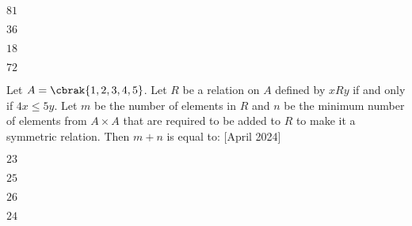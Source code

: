 \begin{enumerate}
\begin{multicols}{4}
\item $81$
\item $36$
\item $18$
\item $72$
\end{multicols}
\end{enumerate}
\item Let $A = \cbrak{1, 2, 3, 4, 5}$. Let $R$ be a relation on $A$ defined by $xRy$ if and only if $4x \leq 5y$. Let $m$ be the number of elements in $R$ and $n$ be the minimum number of elements from $A \times A$ that are required to be added to $R$ to make it a symmetric relation. Then $m + n$ is equal to: \hfill{[April 2024]}
\begin{enumerate}
\begin{multicols}{4}
\item $23$
\item $25$
\item $26$
\item $24$
\end{multicols}
\end{enumerate}
